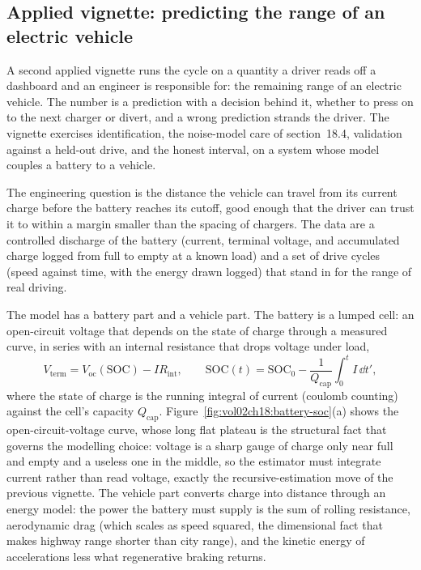 \subsection{Applied vignette: predicting the range of an electric vehicle}

A second applied vignette runs the cycle on a quantity a driver reads off a
dashboard and an engineer is responsible for: the remaining range of an
electric vehicle. The number is a prediction with a decision behind it,
whether to press on to the next charger or divert, and a wrong prediction
strands the driver. The vignette exercises identification, the noise-model
care of section~18.4, validation against a held-out drive, and the honest
interval, on a system whose model couples a battery to a vehicle.

 The engineering question is the
distance the vehicle can travel from its current charge before the battery
reaches its cutoff, good enough that the driver can trust it to within a
margin smaller than the spacing of chargers. The data are a controlled
discharge of the battery (current, terminal voltage, and accumulated charge
logged from full to empty at a known load) and a set of drive cycles
(speed against time, with the energy drawn logged) that stand in for the
range of real driving.

 The model has a
battery part and a vehicle part. The battery is a lumped cell: an
open-circuit voltage that depends on the state of charge through a measured
curve, in series with an internal resistance that drops voltage under load,
\[
V_{\text{term}} = V_{\text{oc}}(\text{SOC}) - I R_{\text{int}},
\qquad
\text{SOC}(t) = \text{SOC}_0 - \frac{1}{Q_{\text{cap}}}\int_0^t I\,\dd t',
\]
where the state of charge is the running integral of current (coulomb
counting) against the cell's capacity $Q_{\text{cap}}$.
Figure~\ref{fig:vol02ch18:battery-soc}(a) shows the open-circuit-voltage
curve, whose long flat plateau is the structural fact that governs the
modelling choice: voltage is a sharp gauge of charge only near full and
empty and a useless one in the middle, so the estimator must integrate
current rather than read voltage, exactly the recursive-estimation move of
the previous vignette. The vehicle part converts charge into distance
through an energy model: the power the battery must supply is the sum of
rolling resistance, aerodynamic drag (which scales as speed squared, the
dimensional fact that makes highway range shorter than city range), and the
kinetic energy of accelerations less what regenerative braking returns.

